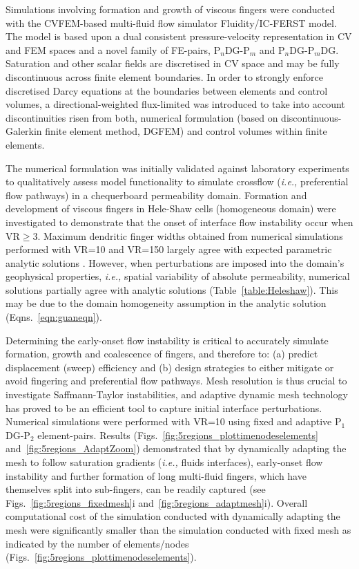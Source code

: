 \documentclass[preprint,authoryear,12pt]{elsarticle}
\newcommand{\PN}[2][error]{P$_{#1}$DG-P$_{#2}$}
\newcommand{\PNDG}[2][error]{P$_{#1}$DG-P$_{#2}$DG}
\newcommand{\ie}{{\it i.e., }}
\begin{document}
\medskip
Simulations involving formation and growth of viscous fingers were conducted with the CVFEM-based multi-fluid flow simulator Fluidity/IC-FERST model. The model is based upon a dual consistent pressure-velocity representation in CV and FEM spaces and a novel family of FE-pairs, \PN[n]{m} and \PNDG[n]{m}. Saturation and other scalar fields are discretised in CV space and may be fully discontinuous across finite element boundaries. In order to strongly enforce discretised Darcy equations at the boundaries between elements and control volumes, a directional-weighted flux-limited was introduced to take into account discontinuities risen from both, numerical formulation (based on discontinuous-Galerkin finite element method, DGFEM) and control volumes within finite elements.

\medskip
The numerical formulation was initially validated against laboratory experiments \citep{dawe_2008} to qualitatively assess model functionality to simulate crossflow (\ie preferential flow pathways) in a chequerboard permeability domain. Formation and development of viscous fingers in Hele-Shaw cells (homogeneous domain) were investigated to demonstrate that the onset of interface flow instability occur when VR$\ge$3. Maximum dendritic finger widths obtained from numerical simulations performed with VR=10 and VR=150 largely agree with expected parametric analytic solutions \citep{mclean_1981,guan_2003}. However, when perturbations are imposed into the domain's geophysical properties, \ie spatial variability of absolute permeability, numerical solutions partially agree with analytic solutions (Table~\ref{table:Heleshaw}). This may be due to the domain homogeneity assumption in the analytic solution (Eqns.~\ref {eqn:guaneqn}).

\medskip
Determining the early-onset flow instability is critical to accurately simulate formation, growth and coalescence of fingers, and therefore to: (a) predict displacement (sweep) efficiency and (b) design strategies to either mitigate or avoid fingering and preferential flow pathways. Mesh resolution is thus crucial to investigate Saffmann-Taylor instabilities, and adaptive dynamic mesh technology has proved to be an efficient tool to capture initial interface perturbations. Numerical simulations were performed with VR=10 using fixed and adaptive \PN[1]{2} element-pairs. Results (Figs.~\ref{fig:5regions_plottimenodeselements} and~\ref{fig:5regions_AdaptZoom}) demonstrated that by dynamically adapting the mesh to follow saturation gradients (\ie fluids interfaces), early-onset flow instability and further formation of long multi-fluid fingers, which have themselves split into sub-fingers, can be readily captured (see Figs.~\ref{fig:5regions_fixedmesh}i and~\ref{fig:5regions_adaptmesh}i). Overall computational cost of the simulation conducted with dynamically adapting the mesh were significantly smaller than the simulation conducted with fixed mesh as indicated by the number of elements/nodes (Figs.~\ref{fig:5regions_plottimenodeselements}).
\end{document}
